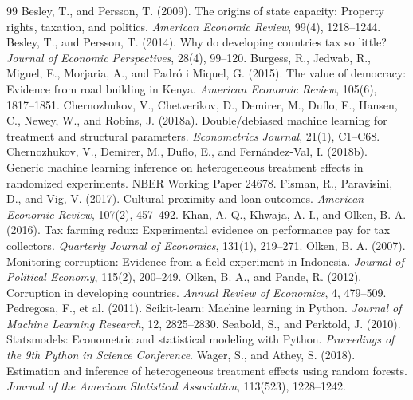 \documentclass[11pt]{article}
\begin{document}
\begin{thebibliography}{99}
 Besley, T., and Persson, T. (2009). The origins of state capacity: Property rights, taxation, and politics. \textit{American Economic Review}, 99(4), 1218--1244.
 Besley, T., and Persson, T. (2014). Why do developing countries tax so little? \textit{Journal of Economic Perspectives}, 28(4), 99--120.
 Burgess, R., Jedwab, R., Miguel, E., Morjaria, A., and Padr\'o i Miquel, G. (2015). The value of democracy: Evidence from road building in Kenya. \textit{American Economic Review}, 105(6), 1817--1851.
 Chernozhukov, V., Chetverikov, D., Demirer, M., Duflo, E., Hansen, C., Newey, W., and Robins, J. (2018a). Double/debiased machine learning for treatment and structural parameters. \textit{Econometrics Journal}, 21(1), C1--C68.
 Chernozhukov, V., Demirer, M., Duflo, E., and Fern\'andez-Val, I. (2018b). Generic machine learning inference on heterogeneous treatment effects in randomized experiments. NBER Working Paper 24678.
 Fisman, R., Paravisini, D., and Vig, V. (2017). Cultural proximity and loan outcomes. \textit{American Economic Review}, 107(2), 457--492.
 Khan, A. Q., Khwaja, A. I., and Olken, B. A. (2016). Tax farming redux: Experimental evidence on performance pay for tax collectors. \textit{Quarterly Journal of Economics}, 131(1), 219--271.
 Olken, B. A. (2007). Monitoring corruption: Evidence from a field experiment in Indonesia. \textit{Journal of Political Economy}, 115(2), 200--249.
 Olken, B. A., and Pande, R. (2012). Corruption in developing countries. \textit{Annual Review of Economics}, 4, 479--509.
 Pedregosa, F., et al. (2011). Scikit-learn: Machine learning in Python. \textit{Journal of Machine Learning Research}, 12, 2825--2830.
 Seabold, S., and Perktold, J. (2010). Statsmodels: Econometric and statistical modeling with Python. \textit{Proceedings of the 9th Python in Science Conference}.
 Wager, S., and Athey, S. (2018). Estimation and inference of heterogeneous treatment effects using random forests. \textit{Journal of the American Statistical Association}, 113(523), 1228--1242.
\end{thebibliography}
\end{document}
